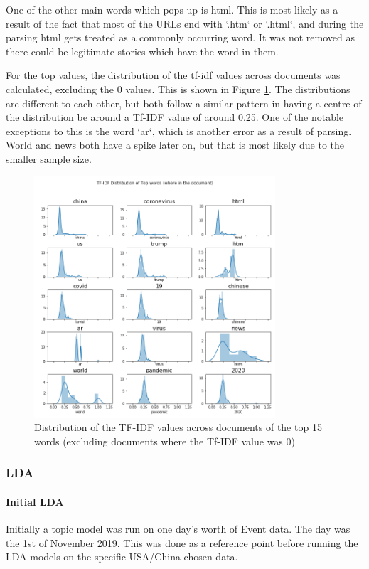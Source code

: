 One of the other main words which pops up is html. This is most likely as a result of the fact that most of the URLs end with `.htm` or `.html`, and during the parsing html gets treated as a commonly occurring word. It was not removed as there could be legitimate stories which have the word in them. 

For the top values, the distribution of the tf-idf values across documents was calculated, excluding the 0 values. This is shown in Figure \ref{fig:tfidfdist}. The distributions are different to each other, but both follow a similar pattern in having a centre of the distribution be around a Tf-IDF value of around 0.25. One of the notable exceptions to this is the word `ar`, which is another error as a result of parsing. World and news both have a spike later on, but that is most likely due to the smaller sample size.

\begin{figure}[H]
	\centering
	\includegraphics[width=0.8\textwidth]{Images/usa_tfidf_top_distribution.png}
	\caption{Distribution of the TF-IDF values across documents of the top 15 words (excluding documents where the Tf-IDF value was 0)}
	\label{fig:tfidfdist}
\end{figure}

\subsubsection{LDA}
\paragraph{Initial LDA}
Initially a topic model was run on one day's worth of Event data. The day was the 1st of November 2019. This was done as a reference point before running the LDA models on the specific USA/China chosen data.

